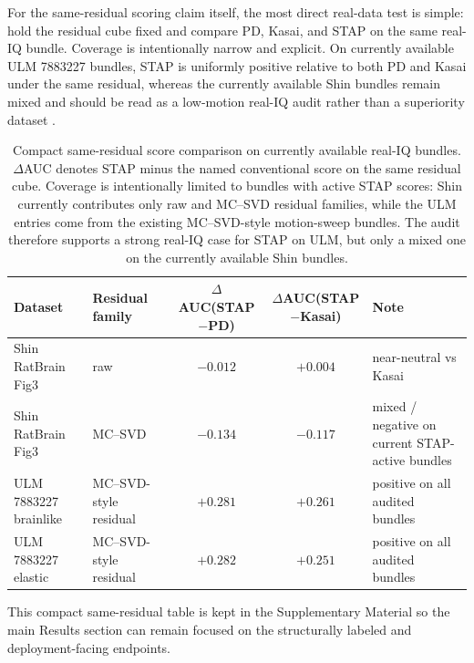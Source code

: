 For the same-residual scoring claim itself, the most direct real-data test is simple: hold the residual cube fixed and compare PD, Kasai, and STAP on the same real-IQ bundle. Coverage is intentionally narrow and explicit. On currently available ULM 7883227 bundles, STAP is uniformly positive relative to both PD and Kasai under the same residual, whereas the currently available Shin bundles remain mixed and should be read as a low-motion real-IQ audit rather than a superiority dataset \cite{ChavignonZenodo7883227,HeilesULMBenchmark2021,ShinLOCAULM2024,ShinZenodo10711806}.
\ifSTAPSUPPLEMENTONLY
\begin{table}[t]
\centering
\small
\begin{tabular}{l l c c l}
\hline
Dataset & Residual family & $\Delta$AUC(STAP$-$PD) & $\Delta$AUC(STAP$-$Kasai) & Note \\
\hline
Shin RatBrain Fig3 & raw & $-0.012$ & $+0.004$ & near-neutral vs Kasai \\
Shin RatBrain Fig3 & MC--SVD & $-0.134$ & $-0.117$ & mixed / negative on current STAP-active bundles \\
ULM 7883227 brainlike & MC--SVD-style residual & $+0.281$ & $+0.261$ & positive on all audited bundles \\
ULM 7883227 elastic & MC--SVD-style residual & $+0.282$ & $+0.251$ & positive on all audited bundles \\
\hline
\end{tabular}
\caption{Compact same-residual score comparison on currently available real-IQ bundles. $\Delta$AUC denotes STAP minus the named conventional score on the same residual cube. Coverage is intentionally limited to bundles with active STAP scores: Shin currently contributes only raw and MC--SVD residual families, while the ULM entries come from the existing MC--SVD-style motion-sweep bundles. The audit therefore supports a strong real-IQ case for STAP on ULM, but only a mixed one on the currently available Shin bundles.}
\label{tab:realdata_detector_head_audit}
\end{table}
\else
\noindent This compact same-residual table is kept in the Supplementary Material so the main Results section can remain focused on the structurally labeled and deployment-facing endpoints.
\fi
